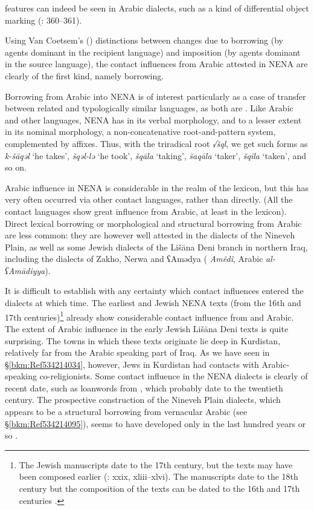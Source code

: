 \documentclass[output=paper]{langsci/langscibook}
\begin{document}
features can indeed be seen in  Arabic dialects, such as a kind of {differential object marking} (\citealt{Coghill2014}: 360–361).

Using Van Coetsem’s (\citeyear{VanCoetsem1988,VanCoetsem2000}) distinctions between changes due to borrowing (by agents dominant in the {recipient language}) and {imposition} (by agents dominant in the {source language}), the contact influences from Arabic attested in NENA are clearly of the first kind, namely borrowing.

Borrowing from Arabic into NENA is of interest particularly as a case of {transfer} between related and typologically similar languages, as both are . Like Arabic and other  languages, NENA has in its verbal morphology, and to a lesser extent in its nominal morphology, a {non-concatenative} {root-and-pattern} system, complemented by affixes. Thus, with the triradical {root} \textit{√šql}, we get such forms as \textit{k-šāqəl} ‘he takes’, \textit{šqəl-lə} ‘he took’, \textit{šqāla} ‘taking’, \textit{šaqāla} ‘taker’, \textit{šqila} ‘taken’, and so on.

Arabic influence in NENA is considerable in the realm of the lexicon, but this has very often occurred via other contact languages, rather than directly. (All the contact languages show great influence from Arabic, at least in the lexicon). Direct lexical borrowing or morphological and structural borrowing from Arabic are less common: they are however well attested in the  dialects of the Nineveh Plain, as well as some Jewish dialects of the Lišāna Deni branch in northern Iraq, including the dialects of Zakho, Nerwa and ʕAmədya ( \textit{Amêdî}, Arabic \textit{al\nobreakdash-ʕAmādiyya}).

It is difficult to establish with any certainty which contact influences entered the dialects at which time. The earliest  and Jewish NENA texts (from the 16th and 17th centuries)\footnote{The Jewish manuscripts date to the 17th century, but the texts may have been composed earlier (\citealt{Sabar1976}: xxix, xliii–xlvi). The  manuscripts date to the 18th century but the composition of the texts can be dated to the 16th and 17th centuries \citep[16]{Mengozzi2002}.} already show considerable contact influence from  and Arabic. The extent of Arabic influence in the early Jewish Lišāna Deni texts \citep{Sabar1984} is quite surprising. The towns in which these texts originate lie deep in Kurdistan, relatively far from the Arabic speaking part of Iraq. As we have seen in §\ref{bkm:Ref534214034}, however, {Jews} in Kurdistan had contacts with Arabic-speaking co{}-religionists. Some contact influence in the NENA dialects is clearly of recent date, such as {loanwords} from , which probably date to the twentieth century. The {prospective} construction of the  Nineveh Plain dialects, which appears to be a structural borrowing from vernacular Arabic (see §\ref{bkm:Ref534214095}), seems to have developed only in the last hundred years or so \citep[375]{Coghill2010}.
\end{document}
